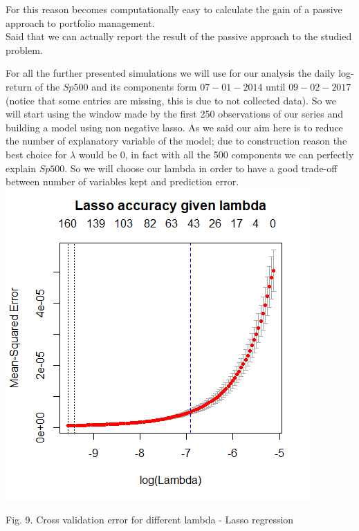 \documentclass{article}%
\begin{document}
For this reason becomes computationally easy to calculate the gain of a passive approach to portfolio management. 
\\

Said that we can actually report the result of the passive approach to the studied problem.

For all the further presented simulations we will use for our analysis the daily log-return of the $Sp500$ and its components form $07-01-2014$ until $09-02-2017$ (notice that some entries are missing, this is due to not collected data). So we will start using the window made by the first 250 observations of our series and building a model using non negative lasso. As we said our aim here is to reduce the number of explanatory variable of the model; due to construction reason the best choice for $\lambda$ would be 0, in fact with all the 500 components we can perfectly explain $Sp500$. So we will choose our lambda in order to have a good trade-off between number of variables kept and prediction error. 
\\


\includegraphics[scale=0.75]{lassoplot}
\begin{center}
\begin{small}
Fig. 9. Cross validation error for different lambda - Lasso regression
\\

\end{small}
\end{center}
\end{document}
